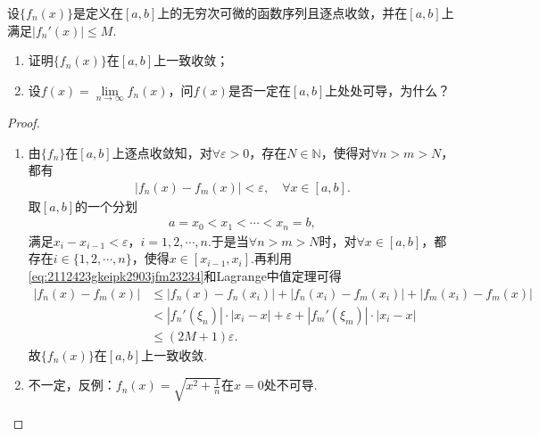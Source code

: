 \documentclass[../../main.tex]{subfiles}%
\begin{document}
\begin{example}
设$\{f_n(x)\}$是定义在$[a,b]$上的无穷次可微的函数序列且逐点收敛，并在$[a,b]$上满足$\left|f_n'(x)\right| \leqslant M$.
\begin{enumerate}[(1)]
\item 证明$\{f_n(x)\}$在$[a,b]$上一致收敛；

\item  设$f(x) = \lim\limits_{n \to \infty} f_n(x)$，问$f(x)$是否一定在$[a,b]$上处处可导，为什么？
\end{enumerate}
\end{example}
\begin{proof}
\begin{enumerate}[(1)]
\item 由$\{ f_n \}$在$[a,b]$上逐点收敛知，对$\forall \varepsilon >0$，存在$N\in \mathbb{N}$，使得对$\forall n>m>N$，都有
\begin{align}\label{eq:2112423gkeipk2903jfm23234}
| f_n(x) -f_m(x) |<\varepsilon ,\quad \forall x\in [a,b].
\end{align}
取$[a,b]$的一个分划
\begin{align*}
a=x_0<x_1<\cdots <x_n=b,
\end{align*}
满足$x_i-x_{i-1}<\varepsilon$，$i=1,2,\cdots,n.$于是当$\forall n>m>N$时，对$\forall x\in [a,b]$，都存在$i\in \{ 1,2,\cdots,n \}$，使得$x\in [x_{i-1},x_i]$.再利用\eqref{eq:2112423gkeipk2903jfm23234}和Lagrange中值定理可得
\begin{align*}
| f_n(x) -f_m(x) |&\leqslant | f_n(x) -f_n(x_i) |+| f_n(x_i) -f_m(x_i) |+| f_m(x_i) -f_m(x) | \\
&<| f_n'(\xi _n) |\cdot| x_i-x |+\varepsilon +| f_m'(\xi _m) |\cdot| x_i-x | \\
&\leqslant (2M+1)\varepsilon.
\end{align*}
故$\{ f_n(x) \}$在$[a,b]$上一致收敛.

\item 不一定，反例：$f_n(x) =\sqrt{x^2+\frac{1}{n}}$在$x=0$处不可导.
\end{enumerate}
\end{proof}
\end{document}
